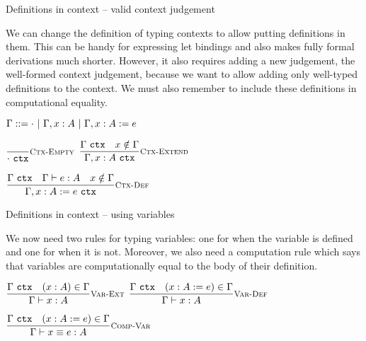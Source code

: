 \documentclass{beamer}
\begin{document}
\begin{frame}{Definitions in context -- valid context judgement}

We can change the definition of typing contexts to allow putting definitions in them. This can be handy for expressing let bindings and also makes fully formal derivations much shorter. However, it also requires adding a new judgement, the well-formed context judgement, because we want to allow adding only well-typed definitions to the context. We must also remember to include these definitions in computational equality.

\vspace{1em}

$\Gamma ::= \emptytypingctx \pipe \extend{\Gamma}{x}{A} \pipe \extend{\Gamma}{x}{A}[e]$

\vspace{1em}

\begin{center}
  $\infrule[Ctx-Empty]{}{\ctx{\emptytypingctx}}$ \quad
  $\infrule[Ctx-Extend]{\ctx{\Gamma} \quad \sidecond{x \notin \Gamma}}{\ctx{\extend{\Gamma}{x}{A}}}$

  \vspace{2em}

  $\infrule[Ctx-Def]{\ctx{\Gamma} \quad \typing{e}{A} \quad \sidecond{x \notin \Gamma}}{\ctx{\extend{\Gamma}{x}{A}[e]}}$
\end{center}

\end{frame}

\begin{frame}{Definitions in context -- using variables}

We now need two rules for typing variables: one for when the variable is defined and one for when it is not. Moreover, we also need a computation rule which says that variables are computationally equal to the body of their definition.

\vspace{2em}

\begin{center}

  $\infrule[Var-Ext]{\ctx{\Gamma} \quad \sidecond{(x : A) \in \Gamma}}{\typing{x}{A}}$ \quad
  $\infrule[Var-Def]{\ctx{\Gamma} \quad \sidecond{(x : A := e) \in \Gamma}}{\typing{x}{A}}$

  \vspace{2em}

  $\infrule[Comp-Var]{\ctx{\Gamma} \quad \sidecond{(x : A := e) \in \Gamma}}{\compeq{x}{e}{A}}$
\end{center}

\end{frame}
\end{document}

